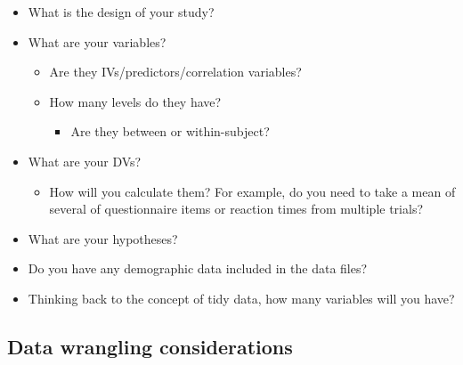 \documentclass[]{book}
\providecommand{\tightlist}{%
  \setlength{\itemsep}{0pt}\setlength{\parskip}{0pt}}
\begin{document}
\begin{itemize}
\tightlist
\item
  What is the design of your study?
\item
  What are your variables?

  \begin{itemize}
  \tightlist
  \item
    Are they IVs/predictors/correlation variables?
  \item
    How many levels do they have?

    \begin{itemize}
    \tightlist
    \item
      Are they between or within-subject?
    \end{itemize}
  \end{itemize}
\item
  What are your DVs?

  \begin{itemize}
  \tightlist
  \item
    How will you calculate them? For example, do you need to take a mean of several of questionnaire items or reaction times from multiple trials?
  \end{itemize}
\item
  What are your hypotheses?
\item
  Do you have any demographic data included in the data files?
\item
  Thinking back to the concept of tidy data, how many variables will you have?
\end{itemize}

\hypertarget{data-wrangling-considerations}{%
\subsection{Data wrangling considerations}\label{data-wrangling-considerations}}
\end{document}
